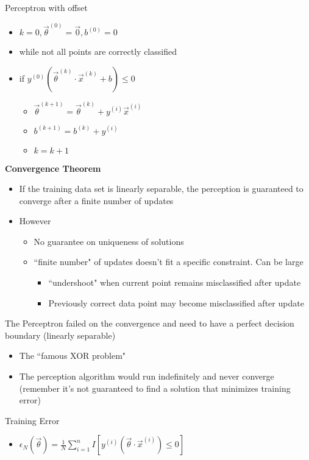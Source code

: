 \documentclass[10pt, oneside]{article}
\begin{document}
Perceptron with offset
\begin{itemize}
    \item $k=0, \vec \theta^{(0)} = \vec 0, b^{(0)} = 0$
    \item while not all points are correctly classified
    \item if $y^{(0)} (\vec \theta ^{(k)} \cdot \vec x^{(k)} + b)\leq0$
    \begin{itemize}
        \item $\vec \theta^{(k+1)} = \vec \theta^{(k)} + y^{(i)} \vec x^{(i)}$
        \item $b^{(k+1)}= b^{(k)} + y^{(i)}$
        \item $k = k+1$
    \end{itemize}
\end{itemize}
\textbf{Convergence Theorem}
\begin{itemize}
    \item If the training data set is linearly separable, the perception is guaranteed to converge after a finite number of updates
    \item However
    \begin{itemize}
        \item No guarantee on uniqueness of solutions
        \item ``finite number" of updates doesn't fit a specific constraint. Can be large
        \begin{itemize}
            \item ``undershoot" when current point remains misclassified after update
            \item Previously correct data point may become misclassified after update
        \end{itemize}
    \end{itemize}
\end{itemize}
The Perceptron failed on the convergence and need to have a perfect decision boundary (linearly separable)
\begin{itemize}
    \item The ``famous XOR problem"
    \item The perception algorithm would run indefinitely and never converge (remember it's not guaranteed to find a solution that minimizes training error)
\end{itemize}
Training Error
\begin{itemize}
    \item $\epsilon_N(\vec \theta) = \frac{1}{N} \sum_{i=1} ^n I[y^{(i)} (\vec \theta \cdot \vec x ^{(i)}) \leq 0]$
\end{itemize}
\end{document}
